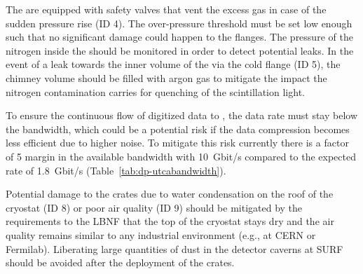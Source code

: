 The  are equipped with safety valves that vent the excess gas in case of the sudden pressure rise (ID 4). The over-pressure threshold must be set low enough such that no significant damage could happen to the flanges. The pressure of the nitrogen inside the  should be monitored in order to detect potential leaks. In the event of a leak towards the inner volume of the  via the cold flange (ID 5), the chimney volume should be filled with argon gas to mitigate the impact the nitrogen contamination carries for quenching of the scintillation light.  

To ensure the continuous flow of digitized data to , the data rate must stay below the  bandwidth, which could be a potential risk if the data compression becomes less efficient due to higher noise. To mitigate this risk currently there is a factor of \num{5} margin in the available bandwidth with \SI{10}{Gbit/s}  compared to the expected rate of \SI{1.8}{Gbit/s} (Table~\ref{tab:dp-utcabandwidth}).

Potential damage to the  crates due to water condensation on the roof of the cryostat (ID 8) or poor air quality (ID 9) should be mitigated by the requirements to the LBNF that the top of the cryostat stays dry and the air quality remains similar to any industrial environment (e.g., at CERN or Fermilab). Liberating large quantities of dust in the detector caverns at SURF should be avoided after the deployment of the  crates.
